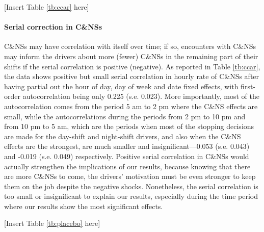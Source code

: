 \documentclass[reviewmode]{restud}
\begin{document}
\begin{center}
    [Insert Table \ref{tb:ccar} here]
\end{center}

\paragraph{Serial correction in C\&NSs} C\&NSs may have correlation with itself over time; if so, encounters with C\&NSs may inform the drivers about more (fewer) C\&NSs in the remaining part of their shifts if the serial correlation is positive (negative). As reported in Table \ref{tb:ccar}, the data shows positive but small serial correlation in hourly rate of C\&NSs after having partial out the hour of day, day of week and date fixed effects, with first-order autocorrelation being only 0.225 (s.e. 0.023). More importantly, most of the autocorrelation comes from the period 5 am to 2 pm where the C\&NS effects are small, while the autocorrelations during the periods from 2 pm to 10 pm and from 10 pm to 5 am, which are the periods when most of the stopping decisions are made for the day-shift and night-shift drivers, and also when the C\&NS effects are the strongest, are much smaller and insignificant---0.053 (s.e. 0.043) and -0.019 (s.e. 0.049) respectively. Positive serial correlation in C\&NSs would actually strengthen the implications of our results, because knowing that there are more C\&NSs to come, the drivers' motivation must be even stronger to keep them on the job despite the negative shocks. Nonetheless, the serial correlation is too small or insignificant to explain our results, especially during the time period where our results show the most significant effects.

\begin{center}
    [Insert Table \ref{tb:placebo} here]
\end{center}
\end{document}
